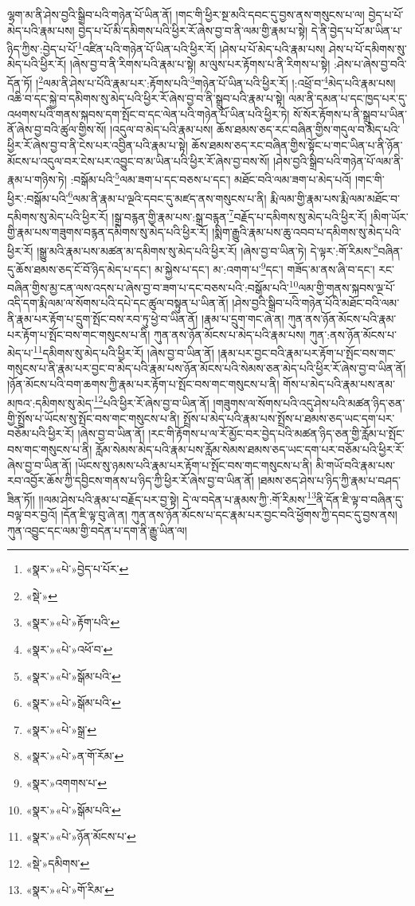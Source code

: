 ལྷག་མ་ནི་ཤེས་བྱའི་སྒྲིབ་པའི་གཉེན་པོ་ཡིན་ནོ། །གང་གི་ཕྱིར་སྔ་མའི་དབང་དུ་བྱས་ནས་གསུངས་པ་ལ། བྱེད་པ་པོ་མེད་པའི་རྣམ་པས། བྱེད་པ་པོ་མི་དམིགས་པའི་ཕྱིར་རོ་ཞེས་བྱ་བ་ནི་ལམ་གྱི་རྣམ་པ་སྟེ། དེ་ནི་བྱེད་པ་པོ་མ་ཡིན་པ་ཉིད་ཀྱིས་:བྱེད་པ་པོ་\footnote{«སྣར་»«པེ་»བྱེད་པ་པོར་}འཛིན་པའི་གཉེན་པོ་ཡིན་པའི་ཕྱིར་རོ། །ཤེས་པ་པོ་མེད་པའི་རྣམ་པས། ཤེས་པ་པོ་དམིགས་སུ་མེད་པའི་ཕྱིར་རོ། །ཞེས་བྱ་བ་ནི་རིགས་པའི་རྣམ་པ་སྟེ། མ་ལུས་པར་རྟོགས་པ་ནི་རིགས་པ་སྟེ། :ཤེས་པ་ཞེས་བྱ་བའི་དོན་ཏོ། །\footnote{«སྡེ་»}ལམ་ནི་ཤེས་པ་པོའི་རྣམ་པར་:རྟོགས་པའི་\footnote{«སྣར་»«པེ་»རྟོག་པའི་}གཉེན་པོ་ཡིན་པའི་ཕྱིར་རོ། །:འཕྲོ་བ་\footnote{«སྣར་»«པེ་»འཕོ་བ་}མེད་པའི་རྣམ་པས། འཆི་བ་དང་སྐྱེ་བ་དམིགས་སུ་མེད་པའི་ཕྱིར་རོ་ཞེས་བྱ་བ་ནི་སྒྲུབ་པའི་རྣམ་པ་སྟེ། ལམ་ནི་དམན་པ་དང་ཁྱད་པར་དུ་འཕགས་པའི་གནས་སྐབས་དག་སྤོང་བ་དང་ལེན་པའི་གཉེན་པོ་ཡིན་པའི་ཕྱིར་ཏེ། སོ་སོར་རྟོགས་པ་ནི་སྒྲུབ་པ་ཡིན་ནོ་ཞེས་བྱ་བའི་ཚུལ་གྱིས་སོ། །འདུལ་བ་མེད་པའི་རྣམ་པས། ཆོས་ཐམས་ཅད་རང་བཞིན་གྱིས་གདུལ་བ་མེད་པའི་ཕྱིར་རོ་ཞེས་བྱ་བ་ནི་ངེས་པར་འབྱིན་པའི་རྣམ་པ་སྟེ། ཆོས་ཐམས་ཅད་རང་བཞིན་གྱིས་སྟོང་པ་གང་ཡིན་པ་ནི་ཉོན་མོངས་པ་འདུལ་བར་ངེས་པར་འབྱུང་བ་མ་ཡིན་པའི་ཕྱིར་རོ་ཞེས་བྱ་བས་སོ། །ཤེས་བྱའི་སྒྲིབ་པའི་གཉེན་པོ་ལམ་ནི་རྣམ་པ་གཉིས་ཏེ། :བསྒོམ་པའི་\footnote{«སྣར་»«པེ་»སྒོམ་པའི་}ལམ་ཟག་པ་དང་བཅས་པ་དང་། མཐོང་བའི་ལམ་ཟག་པ་མེད་པའོ། །གང་གི་ཕྱིར་:བསྒོམ་པའི་\footnote{«སྣར་»«པེ་»སྒོམ་པའི་}ལམ་ནི་རྣམ་པ་ལྔའི་དབང་དུ་མཛད་ནས་གསུངས་པ་ནི། རྨི་ལམ་གྱི་རྣམ་པས་རྨི་ལམ་མཐོང་བ་དམིགས་སུ་མེད་པའི་ཕྱིར་རོ། །སྒྲ་བརྙན་གྱི་རྣམ་པས་:སྒྲ་བརྙན་\footnote{«སྣར་»«པེ་»སྒྲ་}བརྗོད་པ་དམིགས་སུ་མེད་པའི་ཕྱིར་རོ། །མིག་ཡོར་གྱི་རྣམ་པས་གཟུགས་བརྙན་དམིགས་སུ་མེད་པའི་ཕྱིར་རོ། །སྨིག་རྒྱུའི་རྣམ་པས་ཆུ་འབབ་པ་དམིགས་སུ་མེད་པའི་ཕྱིར་རོ། །སྒྱུ་མའི་རྣམ་པས་མཚན་མ་དམིགས་སུ་མེད་པའི་ཕྱིར་རོ། །ཞེས་བྱ་བ་ཡིན་ཏེ། དེ་ལྟར་:གོ་རིམས་\footnote{«སྣར་»«པེ་»ན་གོ་རོམ་}བཞིན་དུ་ཆོས་ཐམས་ཅད་ངོ་བོ་ཉིད་མེད་པ་དང་། མ་སྐྱེས་པ་དང་། མ་:འགག་པ་\footnote{«སྣར་»འགགས་པ་}དང་། གཟོད་མ་ནས་ཞི་བ་དང་། རང་བཞིན་གྱིས་མྱ་ངན་ལས་འདས་པ་ཞེས་བྱ་བ་ཟག་པ་དང་བཅས་པའི་:བསྒོམ་པའི་\footnote{«སྣར་»«པེ་»སྒོམ་པའི་}ལམ་གྱི་གནས་སྐབས་ལྔ་པོ་འདི་དག་རྨི་ལམ་ལ་སོགས་པའི་དཔེ་དང་ཚུལ་བསྟུན་པ་ཡིན་ནོ། །ཤེས་བྱའི་སྒྲིབ་པའི་གཉེན་པོའི་མཐོང་བའི་ལམ་ནི་རྣམ་པར་རྟོག་པ་དྲུག་སྤོང་བས་རབ་ཏུ་ཕྱེ་བ་ཡིན་ནོ། །རྣམ་པ་དྲུག་གང་ཞེ་ན། ཀུན་ནས་ཉོན་མོངས་པའི་རྣམ་པར་རྟོག་པ་སྤོང་བས་གང་གསུངས་པ་ནི། ཀུན་ནས་ཉོན་མོངས་པ་མེད་པའི་རྣམ་པས། ཀུན་:ནས་ཉོན་མོངས་པ་མེད་པ་\footnote{«སྣར་»«པེ་»ཉོན་མོངས་པ་}དམིགས་སུ་མེད་པའི་ཕྱིར་རོ། །ཞེས་བྱ་བ་ཡིན་ནོ། །རྣམ་པར་བྱང་བའི་རྣམ་པར་རྟོག་པ་སྤོང་བས་གང་གསུངས་པ་ནི་རྣམ་པར་བྱང་བ་མེད་པའི་རྣམ་པས་ཉོན་མོངས་པའི་སེམས་ཅན་མེད་པའི་ཕྱིར་རོ་ཞེས་བྱ་བ་ཡིན་ནོ། །ཉོན་མོངས་པའི་བག་ཆགས་ཀྱི་རྣམ་པར་རྟོག་པ་སྤོང་བས་གང་གསུངས་པ་ནི། གོས་པ་མེད་པའི་རྣམ་པས་ནམ་མཁའ་:དམིགས་སུ་མེད་\footnote{«སྡེ་»དམིགས་}པའི་ཕྱིར་རོ་ཞེས་བྱ་བ་ཡིན་ནོ། །གཟུགས་ལ་སོགས་པའི་འདུ་ཤེས་པའི་མཚན་ཉིད་ཅན་གྱི་སྤྲོས་པ་ཡོངས་སུ་སྤོང་བས་གང་གསུངས་པ་ནི། སྤྲོས་པ་མེད་པའི་རྣམ་པས་སྤྲོས་པ་ཐམས་ཅད་ཡང་དག་པར་བཅོམ་པའི་ཕྱིར་རོ། །ཞེས་བྱ་བ་ཡིན་ནོ། །རང་གི་རྟོགས་པ་ལ་རོ་མྱོང་བར་བྱེད་པའི་མཚན་ཉིད་ཅན་གྱི་རློམ་པ་སྤོང་བས་གང་གསུངས་པ་ནི། རློམ་སེམས་མེད་པའི་རྣམ་པས་རློམ་སེམས་ཐམས་ཅད་ཡང་དག་པར་བཅོམ་པའི་ཕྱིར་རོ་ཞེས་བྱ་བ་ཡིན་ནོ། །ཡོངས་སུ་ཉམས་པའི་རྣམ་པར་རྟོག་པ་སྤོང་བས་གང་གསུངས་པ་ནི། མི་གཡོ་བའི་རྣམ་པས་རབ་འབྱོར་ཆོས་ཀྱི་དབྱིངས་གནས་པ་ཉིད་ཀྱི་ཕྱིར་རོ་ཞེས་བྱ་བ་ཡིན་ནོ། །ཐམས་ཅད་ཤེས་པ་ཉིད་ཀྱི་རྣམ་པ་བཤད་ཟིན་ཏོ།། །།ལམ་ཤེས་པའི་རྣམ་པ་བརྗོད་པར་བྱ་སྟེ། དེ་ལ་བདེན་པ་རྣམས་ཀྱི་:གོ་རིམས་\footnote{«སྣར་»«པེ་»གོ་རིམ་}ནི་དོན་ཇི་ལྟ་བ་བཞིན་དུ་བལྟ་བར་བྱའོ། །དོན་ཇི་ལྟ་བུ་ཞེ་ན། ཀུན་ནས་ཉོན་མོངས་པ་དང་རྣམ་པར་བྱང་བའི་ཕྱོགས་ཀྱི་དབང་དུ་བྱས་ནས། ཀུན་འབྱུང་དང་ལམ་གྱི་བདེན་པ་དག་ནི་རྒྱུ་ཡིན་ལ། 